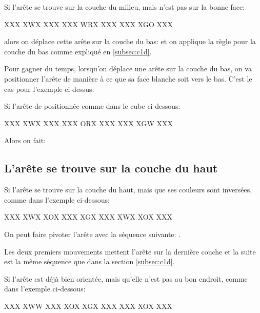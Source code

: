 Si l'arête se trouve sur la couche du milieu, mais n'est pas sur la bonne face:

\begin{center}
	\RubikFaceUp%
	{X}{X}{X}%
	{X}{W}{X}%
	{X}{X}{X}
	\RubikFaceRight%
	{X}{X}{X}%
	{W}{R}{X}%
	{X}{X}{X}
	\RubikFaceFront%
	{X}{X}{X}%
	{X}{G}{O}%
	{X}{X}{X}
\end{center}

alors on déplace cette arête sur la couche du bas:  et on applique la règle pour la couche du bas comme expliqué en \ref{subsec:c1d}.


Pour gagner du temps, lorsqu'on déplace une arête sur la couche du bas, on va positionner l'arête de manière à ce que sa face blanche soit vers le bas. C'est le cas pour l'exemple ci-dessus.

Si l'arête de positionnée comme dans le cube ci-dessous:

\begin{center}
	\RubikFaceUp%
	{X}{X}{X}%
	{X}{W}{X}%
	{X}{X}{X}
	\RubikFaceRight%
	{X}{X}{X}%
	{O}{R}{X}%
	{X}{X}{X}
	\RubikFaceFront%
	{X}{X}{X}%
	{X}{G}{W}%
	{X}{X}{X}
\end{center}

Alors on fait: 

\subsection{L'arête se trouve sur la couche du haut}

Si l'arête se trouve sur la couche du haut, mais que ses couleurs sont inversées, comme dans l'exemple ci-dessous:

\begin{center}
	\RubikFaceUp%
	{X}{X}{X}%
	{X}{W}{X}%
	{X}{O}{X}
	\RubikFaceRight%
	{X}{X}{X}%
	{X}{G}{X}%
	{X}{X}{X}
	\RubikFaceFront%
	{X}{W}{X}%
	{X}{O}{X}%
	{X}{X}{X}
\end{center}

On peut faire pivoter l'arête avec la séquence suivante: .

Les deux premiers mouvements mettent l'arête sur la dernière couche et la suite est la même séquence que dans la section \ref{subsec:c1d}.

\begin{samepage}
Si l'arête est déjà bien orientée, mais qu'elle n'est pas au bon endroit, comme dans l'exemple ci-dessous:

\begin{center}
	\RubikFaceUp%
	{X}{X}{X}%
	{X}{W}{W}%
	{X}{X}{X}
	\RubikFaceRight%
	{X}{O}{X}%
	{X}{G}{X}%
	{X}{X}{X}
	\RubikFaceFront%
	{X}{X}{X}%
	{X}{O}{X}%
	{X}{X}{X}
\end{center}
\end{samepage}


